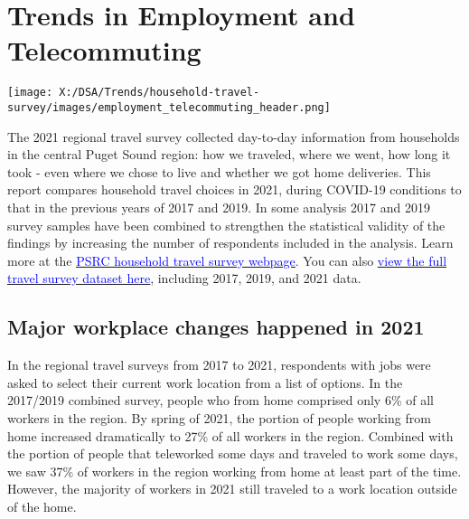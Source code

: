 \documentclass[
  12pt,
]{article}
\author{}
\date{\vspace{-2.5em}}
\begin{document}
\hypertarget{trends-in-employment-and-telecommuting}{%
\section{Trends in Employment and
Telecommuting}\label{trends-in-employment-and-telecommuting}}

\texttt{[image: X:/DSA/Trends/household-travel-survey/images/employment\_telecommuting\_header.png]}

\begin{flushleft}
The 2021 regional travel survey collected day-to-day information from households in the central Puget Sound region: how we traveled, where we went, how long it took - even where we chose to live and whether we got home deliveries. This report compares household travel choices in 2021, during COVID-19 conditions to that in the previous years of 2017 and 2019. In some analysis 2017 and 2019 survey samples have been combined to strengthen the statistical validity of the findings by increasing the number of respondents included in the analysis. Learn more at the \href{https://www.psrc.org/our-work/household-travel-survey-program}{\underline{\textcolor{blue}{PSRC household travel survey webpage}}}. You can also \href{https://household-travel-survey-psregcncl.hub.arcgis.com}{\underline{\textcolor{blue}{view the full travel survey dataset here}}}, including 2017, 2019, and 2021 data.
\end{flushleft}

\hypertarget{major-workplace-changes-happened-in-2021}{%
\subsection{Major workplace changes happened in
2021}\label{major-workplace-changes-happened-in-2021}}

\begin{flushleft}
In the regional travel surveys from 2017 to 2021, respondents with jobs were asked to select their current work location from a list of options. In the 2017/2019 combined survey, people  who from home comprised only 6\% of all workers in the region. By spring of 2021, the portion of people working from home increased dramatically to 27\% of all workers in the region. Combined with the portion of people that teleworked some days and traveled to work some days, we saw 37\% of workers in the region working from home at least part of the time. However, the majority of workers in 2021 still traveled to a work location outside of the home.
\end{flushleft}
\end{document}
